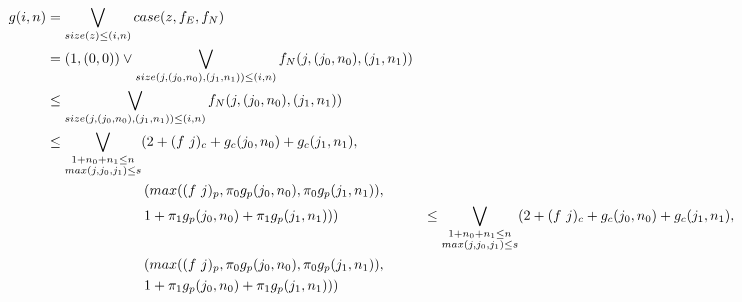 \begin{align*}
  g(i,n) &= \bigvee\limits_{size(z) \leq (i,n)} case(z,f_E,f_N) \\
         &= (1,(0,0)) \vee \bigvee\limits_{size(j,(j_0,n_0),(j_1,n_1)) \leq (i,n)} f_N(j,(j_0,n_0),(j_1,n_1)) \\
         &\leq \bigvee\limits_{size(j,(j_0,n_0),(j_1,n_1)) \leq (i,n)} f_N(j,(j_0,n_0),(j_1,n_1)) \\
         &\leq \bigvee\limits_{\substack{1 + n_0 + n_1 \leq n\\max(j,j_0,j_1)\leq s}} (2 + (f\ j)_c + g_c(j_0,n_0) + g_c(j_1,n_1), \\
         &\qquad\quad\quad\quad\quad\quad (max((f\ j)_p, \pi_0g_p(j_0,n_0), \pi_0g_p(j_1,n_1)), \\
         &\qquad\quad\quad\quad\quad\quad 1 + \pi_1g_p(j_0,n_0) + \pi_1g_p(j_1,n_1)))
         &\leq \bigvee\limits_{\substack{1 + n_0 + n_1 \leq n\\max(j,j_0,j_1)\leq s}} (2 + (f\ j)_c + g_c(j_0,n_0) + g_c(j_1,n_1), \\
         &\qquad\quad\quad\quad\quad\quad (max((f\ j)_p, \pi_0g_p(j_0,n_0), \pi_0g_p(j_1,n_1)), \\
         &\qquad\quad\quad\quad\quad\quad 1 + \pi_1g_p(j_0,n_0) + \pi_1g_p(j_1,n_1)))
\end{align*}
%
